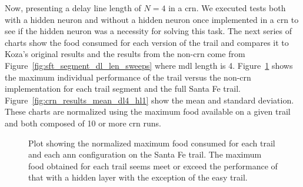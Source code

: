\clearpage
Now, presenting a delay line length of $N=4$ in a \gls{crn}. We executed tests both with a hidden neuron and without a hidden neuron once implemented in a \gls{crn} to see if the hidden neuron was a necessity for solving this task. The next series of charts show the food consumed for each version of the trail and compares it to Koza's original results and the results from the non-\gls{crn} come from Figure~\ref{fig:sft_segment_dl_len_sweeps} where \gls{mdl} length is 4. Figure~\ref{fig:crn_results_max_dl4_hl1} shows the maximum individual performance of the trail versus the non-\gls{crn} implementation for each trail segment and the full Santa Fe trail. Figure~\ref{fig:crn_results_mean_dl4_hl1} show the mean and standard deviation. These charts are normalized using the maximum food available on a given trail and both composed of 10 or more \gls{crn} runs.

\begin{figure}[hbt]
\centering
{}
\caption[Maximum Normalized Food Results with CRN]{Plot showing the normalized maximum food consumed for each trail and each \gls{ann} configuration on the Santa Fe trail. The maximum food obtained for each trail seems meet or exceed the performance of that with a hidden layer with the exception of the easy trail.}
\label{fig:crn_results_max_dl4_hl1}
\end{figure}


